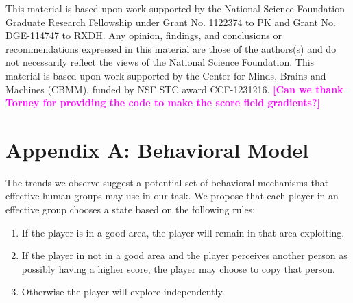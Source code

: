 \documentclass[12pt,letterpaper]{article}
\newcommand{\andrew}[1]{\textcolor{magenta}{\bf [#1]}}
\begin{document}
\small

This material is based upon work supported by the National Science
Foundation Graduate Research Fellowship under Grant No. 1122374 to PK
and Grant No. DGE-114747 to RXDH. Any opinion, findings, and
conclusions or recommendations expressed in this material are those of
the authors(s) and do not necessarily reflect the views of the
National Science Foundation.  This material is based upon work
supported by the Center for Minds, Brains and Machines (CBMM), funded
by NSF STC award CCF-1231216.
\andrew{Can we thank Torney for providing the code to make the score field gradients?}




\setlength{\bibleftmargin}{.125in}
\setlength{\bibindent}{-\bibleftmargin}

\small{
  
}


\section*{Appendix A: Behavioral Model}

The trends we observe suggest a potential set of behavioral mechanisms
that effective human groups may use in our task.  We propose that each
player in an effective group chooses a state based on the following
rules:
\begin{enumerate}
\item
  If the player is in a good area, the player will remain in that area
  exploiting.
\item
  If the player in not in a good area and the player perceives another
  person as possibly having a higher score, the player may choose to
  copy that person.
\item
  Otherwise the player will explore independently.
\end{enumerate}
\end{document}
